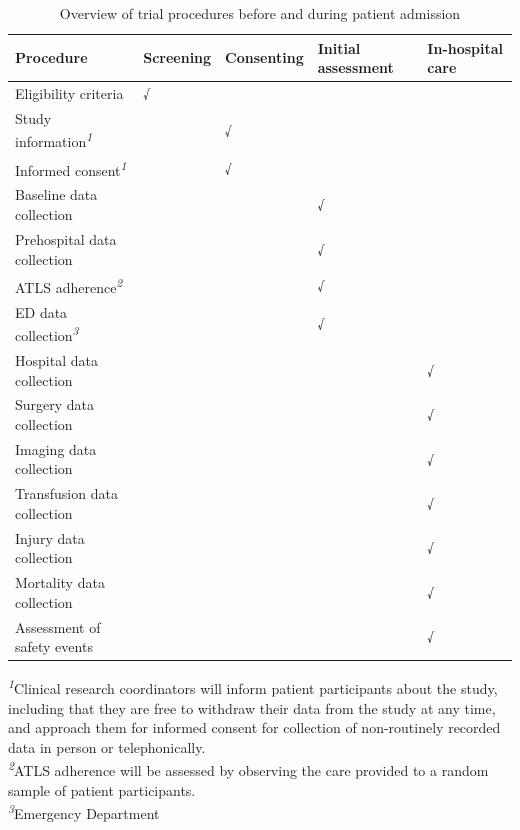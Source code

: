 \documentclass[
]{scrartcl}
\begin{document}
\hypertarget{tbl-procedures-baseline}{}
\setlength{\LTpost}{0mm}
\begin{longtable}{lllll}
\caption{\label{tbl-procedures-baseline}Overview of trial procedures before and during patient admission }\tabularnewline

\toprule
Procedure & Screening & Consenting & Initial assessment & In-hospital care \\ 
\midrule\addlinespace[2.5pt]
Eligibility criteria & √ &  &  &  \\ 
Study information\textsuperscript{\textit{1}} &  & √ &  &  \\ 
Informed consent\textsuperscript{\textit{1}} &  & √ &  &  \\ 
Baseline data collection &  &  & √ &  \\ 
Prehospital data collection &  &  & √ &  \\ 
ATLS adherence\textsuperscript{\textit{2}} &  &  & √ &  \\ 
ED data collection\textsuperscript{\textit{3}} &  &  & √ &  \\ 
Hospital data collection &  &  &  & √ \\ 
Surgery data collection &  &  &  & √ \\ 
Imaging data collection &  &  &  & √ \\ 
Transfusion data collection &  &  &  & √ \\ 
Injury data collection &  &  &  & √ \\ 
Mortality data collection &  &  &  & √ \\ 
Assessment of safety events &  &  &  & √ \\ 
\bottomrule
\end{longtable}
\begin{minipage}{\linewidth}
\textsuperscript{\textit{1}}Clinical research coordinators will inform patient participants about the study, including that they are free to withdraw their data from the study at any time, and approach them for informed consent for collection of non-routinely recorded data in person or telephonically.\\
\textsuperscript{\textit{2}}ATLS adherence will be assessed by observing the care provided to a random sample of patient participants.\\
\textsuperscript{\textit{3}}Emergency Department\\
\end{minipage}
\end{document}
